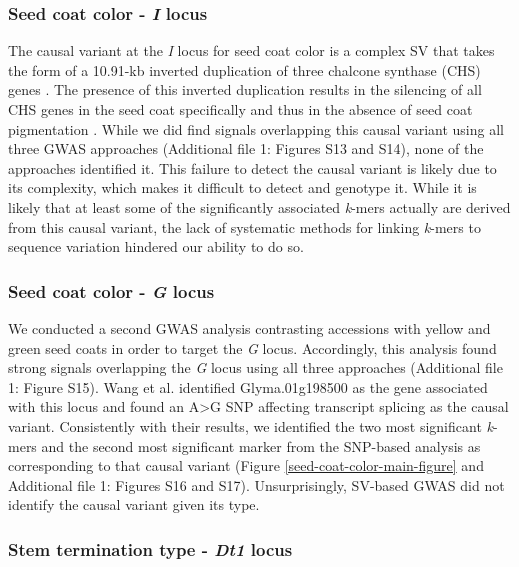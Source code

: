 \documentclass{article}
\begin{document}
\subsubsection*{Seed coat color - \textit{I} locus}

The causal variant at the \textit{I} locus for seed coat color is a complex SV
that takes the form of a 10.91-kb inverted duplication of three chalcone
synthase (CHS) genes \citep[CHS1, CHS3 and CHS4;][]{tuteja2008}. The presence of
this inverted duplication results in the silencing of all CHS genes in the seed
coat specifically and thus in the absence of seed coat pigmentation
\citep{tuteja2009}. While we did find signals overlapping this causal variant
using all three GWAS approaches (Additional file 1: Figures S13 and
S14), none of the approaches identified
it. This failure to detect the causal variant is likely due
to its complexity, which makes it difficult to detect and genotype it. While it
is likely that at least some of the significantly associated \textit{k}-mers
actually are derived from this causal variant, the lack of systematic methods for
linking \textit{k}-mers to sequence variation hindered our ability to do so.

\subsubsection*{Seed coat color - \textit{G} locus}

We conducted a second GWAS analysis contrasting accessions with yellow and
green seed coats in order to target the \textit{G} locus. Accordingly, this
analysis found strong signals overlapping the \emph{G} locus using all three
approaches (Additional file 1: Figure S15).
Wang et al. \cite{wang2018} identified Glyma.01g198500 as the gene associated with
this locus and found an A>G SNP affecting transcript splicing as the causal
variant. Consistently with their results, we identified the two
most significant \emph{k}-mers and the second most significant marker from the
SNP-based analysis as corresponding to that causal variant (Figure
\ref{seed-coat-color-main-figure} and Additional file 1: Figures
S16 and
S17). Unsurprisingly, SV-based GWAS
did not identify the causal variant given its type.

\subsubsection*{Stem termination type - \textit{Dt1} locus}
\end{document}
